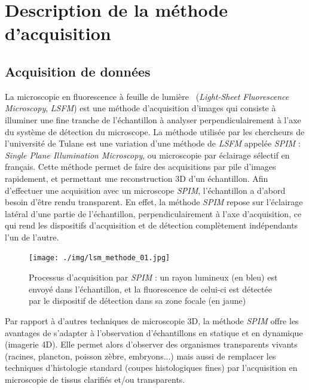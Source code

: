\documentclass[utf8]{stageM2R}
\begin{document}
	\chapter{Description de la méthode d'acquisition}\label{section:02_description}
	{
		\section{Acquisition de données}\label{section:02_01_acquisition}
		{
			La microscopie en fluorescence à feuille de lumière~\cite{cite_lsfm_explication_girard} (\textit{Light-Sheet Fluorescence Microscopy}, \textit{LSFM}) est une méthode d'acquisition d'images qui consiste à illuminer une fine tranche de l'échantillon à analyser perpendiculairement à l'axe du système de détection du microscope. La méthode utilisée par les chercheurs de l'université de Tulane est une variation d'une méthode de \textit{LSFM} appelée \textit{SPIM} : \textit{Single Plane Illumination Microscopy}, ou microscopie par éclairage sélectif en français. Cette méthode permet de faire des acquisitions par pile d'images rapidement, et permettant une reconstruction 3D d'un échantillon. Afin d'effectuer une acquisition avec un microscope \textit{SPIM}, l'échantillon a d'abord besoin d'être rendu transparent. En effet, la méthode \textit{SPIM} repose sur l'éclairage latéral d'une partie de l'échantillon, perpendiculairement à l'axe d'acquisition, ce qui rend les dispositifs d'acquisition et de détection complètement indépendants l'un de l'autre.\\

			\begin{figure}[H]
				\centering
				\texttt{[image: ./img/lsm\_methode\_01.jpg]}
				\caption{Processus d'acquisition par \textit{SPIM} : un rayon lumineux (en bleu) est envoyé dans l'échantillon, et la fluorescence de celui-ci est détectée par le dispositif de détection dans sa zone focale (en jaune)}
				\label{img:lsm_01_how_it_works}
			\end{figure}

			Par rapport à d'autres techniques de microscopie 3D, la méthode \textit{SPIM} offre les avantages de s’adapter à l'observation d’échantillons en statique et en dynamique (imagerie 4D). Elle permet alors d’observer des organismes transparents vivants (racines, plancton, poisson zèbre, embryons...) mais aussi de remplacer les techniques d’histologie standard (coupes histologiques fines) par l'acquisition en microscopie de tissus clarifiés et/ou transparents.\\

}}
\end{document}
